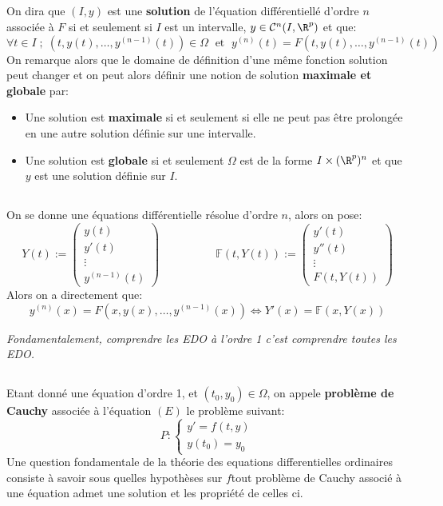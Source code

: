 \subsection*{}
On dira que \((I, y)\) est une \textbf{solution} de l'équation différentiellé d'ordre \( n \) associée à \( F \) si et seulement si \( I \) est un intervalle, \(y \in \mathcal{C}^n(I, \R^p)\) et que:
\[ 
   \forall t \in I \; ; \; (t, y(t), \ldots, y^{(n-1)}(t)) \in \Omega \; \text{ et } \; y^{(n)}(t) = F(t, y(t), \ldots, y^{(n-1)}(t))
\]
On remarque alors que le domaine de définition d'une même fonction solution peut changer et on peut alors définir une notion de solution \textbf{maximale et globale} par:
\begin{itemize}
   \item Une solution est \textbf{maximale} si et seulement si elle ne peut pas être prolongée en une autre solution définie sur une intervalle.
   \item Une solution est \textbf{globale} si et seulement \( \Omega \) est de la forme \(I \times (\R^p)^{n}\) et que \( y \) est une solution définie sur \( I \).
\end{itemize}
\subsection*{}
On se donne une équations différentielle résolue d'ordre \(n\), alors on pose:
\[
   Y(t) := \begin{pmatrix}
      y(t)\\
      y'(t)\\
      \vdots\\
      y^{(n-1)}(t)
   \end{pmatrix} \quad \quad \quad \quad\quad
   \mathbb{F}(t, Y(t)) := \begin{pmatrix}
      y'(t)\\
      y''(t)\\
      \vdots\\
      F(t, Y(t))
   \end{pmatrix}
\]
Alors on a directement que:
\[
   y^{(n)}(x) = F(x, y(x), \ldots, y^{(n-1)}(x)) \Longleftrightarrow Y'(x) = \mathbb{F}(x, Y(x))
\]
\begin{center}
   \textit{Fondamentalement, comprendre les EDO à l'ordre 1 c'est comprendre toutes les EDO.}
\end{center}
\subsection*{}
Etant donné une équation d'ordre 1, et \( (t_0, y_0) \in \Omega \), on appele \textbf{problème de Cauchy} associée à l'équation \( (E) \) le problème suivant:
\[ 
   P: \begin{cases}
      y' = f(t, y)\\
      y(t_0) = y_0
   \end{cases} 
\]
Une question fondamentale de la théorie des equations differentielles ordinaires consiste à savoir sous quelles hypothèses sur \(  f \)tout problème de Cauchy associé à une équation admet une solution et les propriété de celles ci.
